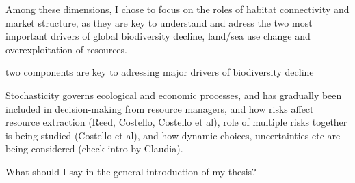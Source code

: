 Among these dimensions, I chose to focus on the roles of habitat connectivity and market structure, as they are key to understand and adress the two most important drivers of global biodiversity decline, land/sea use change and overexploitation of resources. 

two components are key to adressing major drivers of biodiversity decline



Stochasticity governs ecological and economic processes, and has gradually been included in decision-making from resource managers, and how risks affect resource extraction (Reed, Costello, Costello et al), role of multiple risks together is being studied (Costello et al), and how dynamic choices, uncertainties etc are being considered (check intro by Claudia). 
% 
\clearpage


What should I say in the general introduction of my thesis? 

